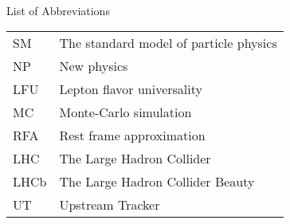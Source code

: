 \singlespacing \normalsize
\hbox{\ }

\vspace{.5in}

\begin{center}
\large{List of Abbreviations}
\end{center}

\vspace{3pt}

\begin{supertabular}{ll}
    SM    & The standard model of particle physics \\
    NP    & New physics \\
    LFU   & Lepton flavor universality \\
    MC    & Monte-Carlo simulation \\
    RFA   & Rest frame approximation \\
    LHC   & The Large Hadron Collider \\
    LHCb  & The Large Hadron Collider Beauty \\
    UT    & Upstream Tracker \\
\end{supertabular}
